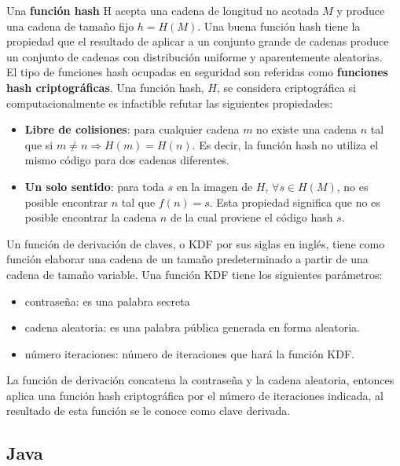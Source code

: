 Una \textbf{función hash} H acepta una cadena de longitud no acotada $M$ y produce una cadena de tamaño fijo $h=H(M)$. Una buena función hash tiene la propiedad que el resultado de aplicar a un conjunto grande de cadenas produce un conjunto de cadenas con distribución uniforme y aparentemente aleatorias\cite{CryptographyNetworkSecurity}.\\
El tipo de funciones hash ocupadas en seguridad son referidas como \textbf{funciones hash criptográficas}. Una función hash, $H$, se considera criptográfica si computacionalmente es infactible refutar las siguientes propiedades\cite{CryptographyNetworkSecurity}:
\begin{itemize}
	\item \textbf{Libre de colisiones}: para cualquier cadena $m$ no existe una cadena $n$ tal que si $m \neq n \Rightarrow H(m) = H(n)$. Es decir, la función hash no utiliza el mismo código para dos cadenas diferentes.
	\item \textbf{Un solo sentido}: para toda $s$ en la imagen de $H$, $\forall s \in H(M)$, no es posible encontrar $n$ tal que $f(n) = s$. Esta propiedad significa que no es posible encontrar la cadena $n$ de la cual proviene el código hash $s$.
\end{itemize}

Un función de derivación de claves, o KDF por sus siglas en inglés, tiene como función elaborar una cadena de un tamaño predeterminado a partir de una cadena de tamaño variable.
Una función KDF tiene los siguientes parámetros\cite{UnderstandingCryptography, CryptographyTheoryPractice}:
\begin{itemize}
	\item contraseña: es una palabra secreta
	\item cadena aleatoria: es una palabra pública generada en forma aleatoria.
	\item número iteraciones: número de iteraciones que hará la función KDF.
\end{itemize}
La función de derivación concatena la contraseña y la cadena aleatoria, entonces aplica una función hash criptográfica por el número de iteraciones indicada, al resultado de esta función se le conoce como clave derivada\cite{UnderstandingCryptography, CryptographyTheoryPractice}.

\subsection{Java}\label{sec:java}

